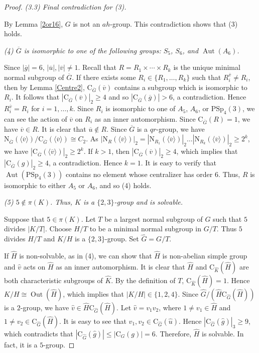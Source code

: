 \documentclass[11pt]{article}
\newcommand{\Out}{\operatorname{Out}}  %
\providecommand{\PSp}{{\mathrm{PSp}}}
\providecommand{\N}{{\mathrm{N}}}
\providecommand{\C}{{\mathrm{C}}}
\providecommand{\Aut}{{\operatorname{Aut}}}
\providecommand{\Out}{{\operatorname{Out}}} %
\providecommand{\gen}[1]{\langle #1 \rangle} %
\providecommand{\gen}[1]{\langle #1 \rangle} %
\providecommand{\gen}[1]{\langle #1 \rangle} %
\providecommand{\olg}{{\overline{g}}}
\providecommand{\olu}{{\overline{u}}}
\providecommand{\olv}{{\overline{v}}}
\providecommand{\olG}{{\overline{G}}}
\providecommand{\whg}{{\widehat{g}}}
\providecommand{\whu}{{\widehat{u}}}
\providecommand{\whv}{{\widehat{v}}}
\providecommand{\whG}{{\widehat{G}}}
\providecommand{\whH}{{\widehat{H}}}
\providecommand{\whK}{{\widehat{K}}}
\begin{document}
\begin{proof}
\medskip
{\sl (3.3) Final contradiction for (3).}
    
    By Lemma \ref{2or16}, $G$ is not an $ah$-group.
    This contradiction shows that (3) holds.

\medskip
{\sl (4) $\overline{G}$ is isomorphic to one of the following groups:
$S_5$, $S_6$, and $\Aut(A_6)$.}

    Since $|\olg|=6$, $|\overline{u}|, |\overline{v}|\neq 1$.
    Recall that $R=R_1\times \cdots \times R_k$ is the unique minimal normal subgroup of $\olG$.
    If there exists some $R_i\in \{R_1,\ldots,R_k\}$ such that $R_i^{\overline{v}}\neq R_i$,
    then by Lemma \ref{Centre2},
    $\C_{\olG}(\olv)$ contains a subgroup which is isomorphic to $R_i$.
    It follows that $|\C_{\olG}(\olv)|_2\geq 4$ and so $|\C_{\olG}(\olg)|>6$, 
    a contradiction.
    Hence $R_i^{\olv}=R_i$ for $i=1,\ldots,k$.
    Since $R_i$ is isomorphic to one of $A_5$, $A_6$, or $\PSp_4(3)$, 
    we can see the action of $\olv$ on $R_i$ as an inner automorphism.
    Since $\C_{\olG}(R)=1$, 
    we have $\olv \in R$.
    It is clear that $\olu\notin R$.
    Since $\olG$ is a $qr$-group,
    we have $\N_{\olG}(\gen{\olv})/\C_{\olG}(\gen{\olv})\cong C_2$.
    As $|\N_R(\gen{\olv})|_2 
        = |\N_{R_1}(\gen{\olv})|_2 \ldots |\N_{R_k}(\gen{\olv})|_2\geq 2^k$,
    we have $|\C_{\olG}(\gen{\olv})|_2\geq 2^k$.
    If $k>1$, then $|\C_{\olG}(\olv)|_2 \geq 4$, 
    which implies that $|\C_{\olG}(g)|_2\geq 4$, a contradiction.
    Hence $k=1$.
    It is easy to verify that $\Aut(\PSp_4(3))$ contains no element whose centralizer has order $6$.
    Thus, $R$ is isomorphic to either $A_5$ or $A_6$, and so (4) holds.

    
    
\medskip
{\sl (5) $5\notin \pi(K)$. Thus, $K$ is a $\{2,3\}$-group and is solvable.}

    Suppose that $5\in \pi(K)$. 
    Let $T$ be a largest normal subgroup of $G$ such that $5$ divides $|K/T|$.
    Choose $H/T$ to be a minimal normal subgroup in $G/T$. 
    Thus $5$ divides $H/T$ and $K/H$ is a $\{2,3\}$-group.
    Set $\whG=G/T$.
    
    If $\whH$ is non-solvable, 
    as in (4), we can show that $\whH$ is non-abelian simple group 
    and $\whv$ acts on $\whH$ as an inner automorphism.
    It is clear that $\whH$ and $\C_{\whK}(\whH)$ are both characteristic subgroups of $\whK$.
    By the definition of $T$, $\C_{\whK}(\whH)=1$.
    Hence $K/H\cong \Out(\whH)$, which implies that $|K/H|\in \{1,2,4\}$.
    Since $\whG/(\whH \C_{\whG}(\whH))$ is a $2$-group, 
    we have $\whv\in \whH \C_{\whG}(\whH)$.
    Let $\whv = v_1 v_2$, where $1\neq v_1 \in \whH$ and $1\neq v_2\in \C_{\whG}(\whH)$.
    It is easy to see that $v_1, v_2\in \C_{\whG}(\whu)$.
    Hence $|\C_{\whG}(\whg)|_3\geq 9$, 
    which contradicts that $|\C_{\whG}(\whg)|\leq |\C_G(g)|=6$. 
    Therefore, $\whH$ is solvable. In fact, it is a $5$-group.


\end{proof}
\end{document}
